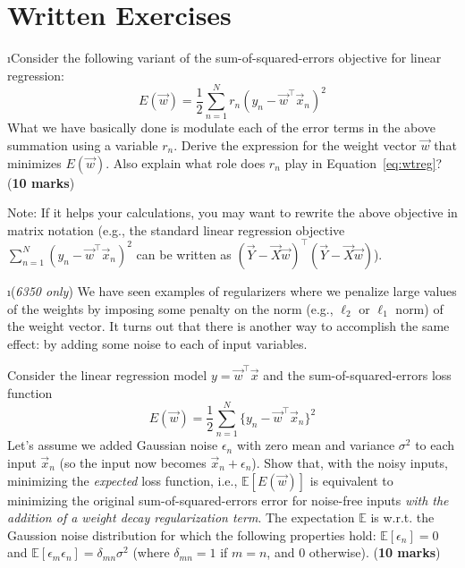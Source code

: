 \documentclass[fleqn]{article}
\begin{document}

\section{Written Exercises}

\bee

\i Consider the following variant of the sum-of-squared-errors objective for linear
regression:
\begin{equation}
 E(\vec{w}) = \frac{1}{2}\sum_{n=1}^N r_n(y_n - \vec{w}^\top\vec{x}_n)^2
\label{eq:wtreg}
\end{equation}
What we have basically done is modulate each of the error terms in 
the above summation using a variable $r_n$. Derive the expression 
for the weight vector $\vec{w}$ that minimizes $E(\vec{w})$. Also 
explain what role does $r_n$ play in Equation~\ref{eq:wtreg}?
(\textbf{10 marks})

Note: If it helps your calculations, you may want to rewrite the above 
objective in matrix notation (e.g., the standard 
linear regression objective $\sum_{n=1}^N (y_n - 
\vec{w}^\top\vec{x}_n)^2$ can be written as $(\vec{Y}-\vec{X}\vec{w})^\top 
(\vec{Y}-\vec{X}\vec{w})$).

\i (\textit{6350 only}) We have seen examples of regularizers
where we penalize large values of the weights by imposing 
some penalty on the norm (e.g., $\ell_2$ or $\ell_1$ norm) 
of the weight vector. It turns out that there is another way to 
accomplish the same effect: by adding some noise to each of input
variables.

Consider the linear regression model 
$y = \vec{w}^\top \vec{x}$ and the sum-of-squared-errors loss 
function 
\[
 E(\vec{w}) = \frac{1}{2}\sum_{n=1}^N \{y_n - \vec{w}^\top \vec{x}_n\}^2
\]
Let's assume we added Gaussian noise $\epsilon_n$ with zero mean
and variance $\sigma^2$ to each input $\vec{x}_n$ (so the input now
becomes $\vec{x}_n + \epsilon_n$). Show that, with the noisy inputs, 
minimizing the \textit{expected} loss function, i.e., $\mathbb{E}[E(\vec{w})]$ 
is equivalent to minimizing the original sum-of-squared-errors error for 
noise-free inputs \textit{with the addition of a weight decay regularization term}. 
The expectation $\mathbb{E}$ is w.r.t. the Gaussion noise distribution 
for which the following properties hold: $\mathbb{E}[\epsilon_n] = 0$ 
and $\mathbb{E}[\epsilon_m\epsilon_n] = \delta_{mn}\sigma^2$ (where 
$\delta_{mn}=1$ if $m=n$, and 0 otherwise). (\textbf{10 marks})
\end{document}

